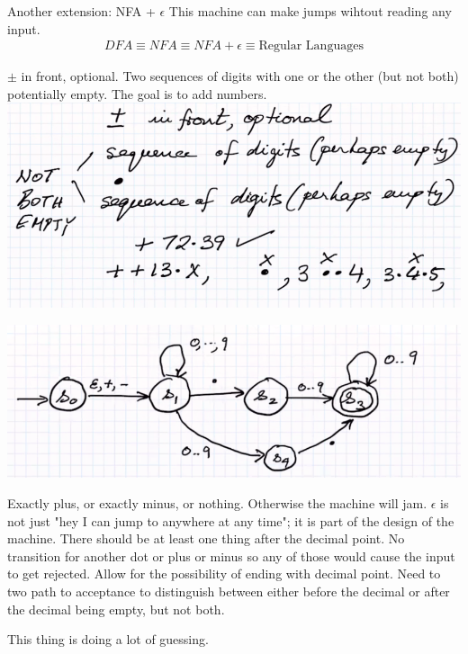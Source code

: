 \documentclass[class=scrartcl, crop=false]{standalone}
\begin{document}
\begin{note}
  Another extension: NFA + $\epsilon$ This machine can make jumps wihtout
  reading any input.
  \begin{gather*}
    DFA \equiv NFA \equiv NFA + \epsilon \equiv \text{Regular Languages}
  \end{gather*}
\end{note}


\begin{example}
  $\pm$ in front, optional. Two sequences of digits with one or the other (but not both) potentially empty. The goal is to add numbers. \\
  \includegraphics[width=\textwidth]{decimal_example.png}

  \includegraphics[width=\textwidth]{decimal_example_dfa.png}

  \begin{enumerate}
    \ii Exactly plus, or exactly minus, or nothing. Otherwise the machine will
    jam. \ii $\epsilon$ is not just "hey I can jump to anywhere at any time"; it
    is part of the design of the machine. \ii There should be at least one thing
    after the decimal point. \ii No transition for another dot or plus or minus
    so any of those would cause the input to get rejected. \ii Allow for the
    possibility of ending with decimal point. \ii Need to two path to acceptance
    to distinguish between either before the decimal or after the decimal being
    empty, but not both.
  \end{enumerate}
  This thing is doing a lot of guessing.
\end{example}
\end{document}
